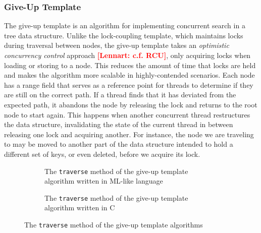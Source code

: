 \documentclass[a4paper,UKenglish,cleveref, autoref, thm-restate]{lipics-v2021}
\newcommand{\lb}[1]{\textbf{\textcolor{red}{[Lennart: #1]}}}
\begin{document}
\subsubsection{Give-Up Template}
\label{give-up-algo}
The give-up template is an algorithm for implementing concurrent search in a tree data structure. Unlike the lock-coupling template, which maintains locks during traversal between nodes, the give-up template takes an \emph{optimistic concurrency control} approach \lb{c.f. RCU}, only acquiring locks when loading or storing to a node. This reduces the amount of time that locks are held and makes the algorithm more scalable in highly-contended scenarios. Each node has a range field that serves as a reference point for threads to determine if they are still on the correct path. If a thread finds that it has deviated from the expected path, it abandons the node by releasing the lock and returns to the root node to start again. This happens when another concurrent thread restructures the data structure, invalidating the state of the current thread in between releasing one lock and acquiring another. For instance, the node we are traveling to may be moved to another part of the data structure intended to hold a different set of keys, or even deleted, before we acquire its lock.

\begin{figure}[!ht]
	\begin{subfigure}[t]{0.45\textwidth}
		 
		\caption{The \lstinline{traverse} method of the give-up template algorithm written in ML-like language}
		\label{traverse_giveup_a}	
	\end{subfigure}\qquad
	\begin{subfigure}[t]{0.48\textwidth}
		 
		\caption{The \lstinline{traverse} method of the give-up template algorithm written in C}
		\label{traverse_giveup_b}
	\end{subfigure}
	\caption{The \lstinline{traverse} method of the give-up template algorithms}
	\label{traverse_giveup}
\end{figure}
\end{document}

